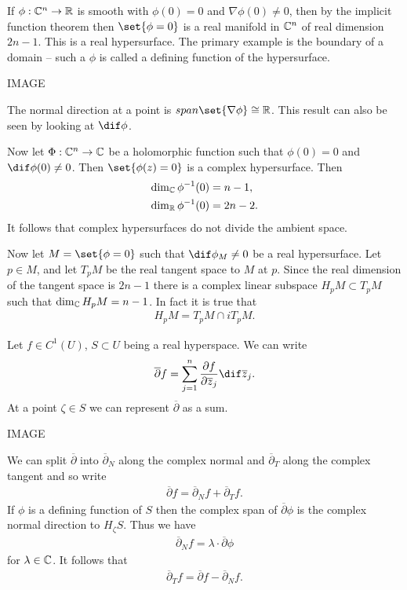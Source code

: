 If $\phi : \mathbb{C}^n \to \mathbb{R}$ is smooth with $\phi (0) = 0$ and $\nabla \phi(0) \neq 0$, then by the implicit function theorem then $\set{\phi = 0 }$ is a real manifold in $\mathbb{C}^n$ of real dimension $2n -1$. This is a real hypersurface. The primary example is the boundary of a domain -- such a $\phi$ is called a defining function of the hypersurface.

IMAGE

The normal direction at a point is $span  \set{\nabla \phi} \cong \R$. This result can also be seen by looking at $\dif \phi$.

Now let $\Phi : \mathbb{C}^n \to \mathbb{C}$ be a holomorphic function such that $\phi(0) = 0$ and $\dif \phi (0) \neq 0$. Then $\set{ \phi(z) = 0}$ is a complex hypersurface. Then
\begin{align*}
    \dim_{\mathbb{C}} \phi^{-1}(0) &= n-1,\\
    \dim_{\mathbb{R}} \phi^{-1}(0) &= 2n-2.
\end{align*}
It follows that complex hypersurfaces do not divide the ambient space.

Now let $M = \set{ \phi = 0}$ such that $\dif \phi_M \neq 0$ be a real hypersurface. Let $p \in M$, and let $T_pM$ be the real tangent space to $M$ at $p$. Since the real dimension of the tangent space is $2n-1$ there is a complex linear subspace $H_pM \subset T_pM$ such that $\dim_{\mathbb{C}} H_pM = n-1$. In fact it is true that
\begin{align*}
    H_pM = T_pM \cap i T_pM.
\end{align*}

Let $f \in C^1(U)$, $S \subset U$ being a real hyperspace. We can write
\begin{align*}
    \overline{\partial} f = \sum_{j =1}^n \frac{\partial f}{\partial \zz_j} \dif \zz_j.
\end{align*}
At a point $\zeta \in S$ we can represent $\overline{\partial}$ as a sum.

IMAGE

We can split $\overline{\partial}$ into $\overline{\partial}_N$ along the complex normal and $\overline{\partial}_T$ along the complex tangent and so write
\begin{align*}
    \overline{\partial} f = \overline{\partial}_N f + \overline{\partial}_T f.
\end{align*}
If $\phi$ is a defining function of $S$ then the complex span of $\overline{\partial} \phi$ is the complex normal direction to $H_\zeta S$. Thus we have
\begin{align*}
    \overline{\partial}_N f = \lambda \cdot \overline{\partial} \phi
\end{align*}
for $\lambda \in \mathbb{C}$. It follows that
\begin{align*}
    \overline{\partial}_T f = \overline{\partial} f - \overline{\partial}_N f.
\end{align*}

